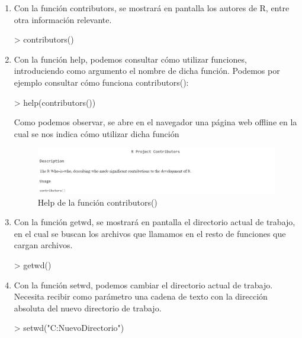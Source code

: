 \documentclass[parskip=full]{scrartcl}
\begin{document}
\begin{enumerate}

\item 
Con la función contributors, se mostrará en pantalla los autores de R, entre otra información relevante.

\begin{Schunk}
\begin{Sinput}
> contributors()
\end{Sinput}
\end{Schunk}


\item 
Con la función help, podemos consultar cómo utilizar funciones, introduciendo como argumento el nombre de dicha función. Podemos por ejemplo consultar cómo funciona contributors():

\begin{Schunk}
\begin{Sinput}
> help(contributors())
\end{Sinput}
\end{Schunk}

Como podemos observar, se abre en el navegador una página web offline en la cual se nos indica cómo utilizar dicha función
\begin{figure}[H]
\centering
\includegraphics[width=0.8\linewidth]{images/Help.jpeg}
\caption{\label{fig:help_image}Help de la función contributors()}
\end{figure}

\item 
Con la función getwd, se mostrará en pantalla el directorio actual de trabajo, en 
el cual se buscan los archivos que llamamos en el resto de funciones que cargan archivos.

\begin{Schunk}
\begin{Sinput}
> getwd()
\end{Sinput}
\end{Schunk}


\item 
Con la función setwd, podemos cambiar el directorio actual de trabajo. Necesita
recibir como parámetro una cadena de texto con la dirección absoluta del nuevo directorio
de trabajo.

\begin{Schunk}
\begin{Sinput}
> setwd("C:NuevoDirectorio")
\end{Sinput}
\end{Schunk}



\end{enumerate}
\end{document}
